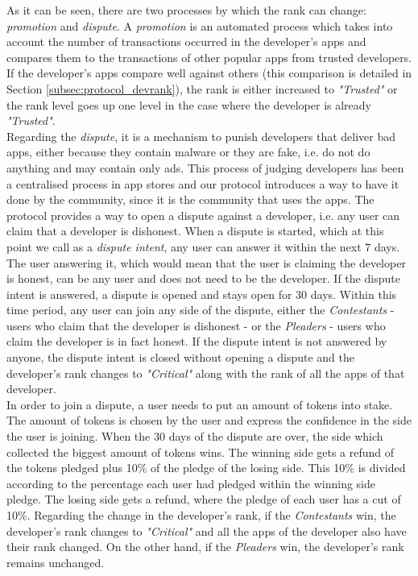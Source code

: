 As it can be seen, there are two processes by which the rank can change: \textit{promotion} and \textit{dispute}. A \textit{promotion} is an automated process which takes into account the number of transactions occurred in the developer's apps and compares them to the transactions of other popular apps from trusted developers. If the developer's apps compare well against others (this comparison is detailed in Section \ref{subsec:protocol_devrank}), the rank is either increased to \textit{"Trusted"} or the rank level goes up one level in the case where the developer is already \textit{"Trusted"}. \\

Regarding the \textit{dispute}, it is a mechanism to punish developers that deliver bad apps, either because they contain malware or they are fake, i.e. do not do anything and may contain only ads. This process of judging developers has been a centralised process in app stores and our protocol introduces a way to have it done by the community, since it is the community that uses the apps. The protocol provides a way to open a dispute against a developer, i.e. any user can claim that a developer is dishonest. When a dispute is started, which at this point we call as a \textit{dispute intent}, any user can answer it within the next 7 days. The user answering it, which would mean that the user is claiming the developer is honest, can be any user and does not need to be the developer. If the dispute intent is answered, a dispute is opened and stays open for 30 days. Within this time period, any user can join any side of the dispute, either the \textit{Contestants} - users who claim that the developer is dishonest - or the \textit{Pleaders} - users who claim the developer is in fact honest. If the dispute intent is not answered by anyone, the dispute intent is closed without opening a dispute and the developer's rank changes to \textit{"Critical"} along with the rank of all the apps of that developer. \\

In order to join a dispute, a user needs to put an amount of tokens into stake. The amount of tokens is chosen by the user and express the confidence in the side the user is joining. When the 30 days of the dispute are over, the side which collected the biggest amount of tokens wins. The winning side gets a refund of the tokens pledged plus 10\% of the pledge of the losing side. This 10\% is divided according to the percentage each user had pledged within the winning side pledge. The losing side gets a refund, where the pledge of each user has a cut of 10\%. Regarding the change in the developer's rank, if the \textit{Contestants} win, the developer's rank changes to \textit{"Critical"} and all the apps of the developer also have their rank changed. On the other hand, if the \textit{Pleaders} win, the developer's rank remains unchanged. \\


